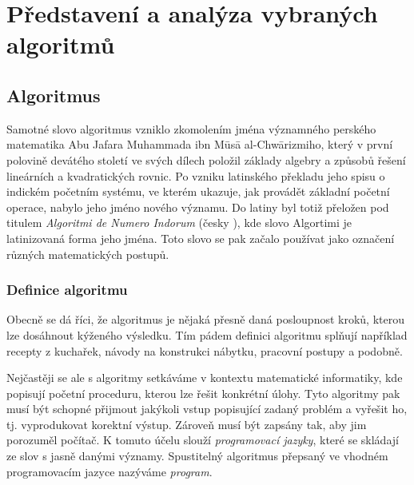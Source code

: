 \documentclass[12pt]{report}			%
\begin{document}
		
				
	\part{Představení a analýza vybraných algoritmů}
	
		\chapter{Algoritmus}
		Samotné slovo algoritmus vzniklo zkomolením jména významného perského matematika Abu Jafara Muhammada ibn Mūsā al-Chwārizmiho, který v první polovině devátého století ve svých
dílech položil základy algebry a způsobů řešení lineárních a kvadratických rovnic. Po vzniku latinského překladu
jeho spisu o indickém početním systému, ve kterém ukazuje, jak provádět základní početní
operace, nabylo jeho jméno nového významu. Do latiny byl totiž přeložen pod titulem \emph{Algoritmi de Numero Indorum} (česky ), kde slovo Algortimi je latinizovaná
forma jeho jména. Toto slovo se pak začalo používat jako označení různých
matematických postupů. \cite{cerny} \cite{neckar} \cite{mehri}
			
		
			
			\section{Definice algoritmu}
			Obecně se dá říci, že algoritmus je nějaká přesně daná posloupnost kroků, kterou lze dosáhnout kýženého výsledku. Tím pádem definici algoritmu splňují například recepty z kuchařek, návody na konstrukci nábytku, pracovní postupy a podobně. \cite{neckar}
			
			
			Nejčastěji se ale s algoritmy setkáváme v kontextu matematické informatiky, kde popisují početní proceduru, kterou lze řešit konkrétní úlohy. Tyto algoritmy pak musí být schopné přijmout jakýkoli vstup popisující zadaný problém a vyřešit ho, tj. vyprodukovat korektní výstup. Zároveň musí být zapsány tak, aby jim porozuměl počítač. K tomuto účelu slouží \emph{programovací jazyky}, které se skládají ze slov s jasně danými významy. Spustitelný algoritmus přepsaný ve vhodném programovacím jazyce nazýváme \emph{program}. \cite{dvorsky} 
			\newpage
			
\end{document}
